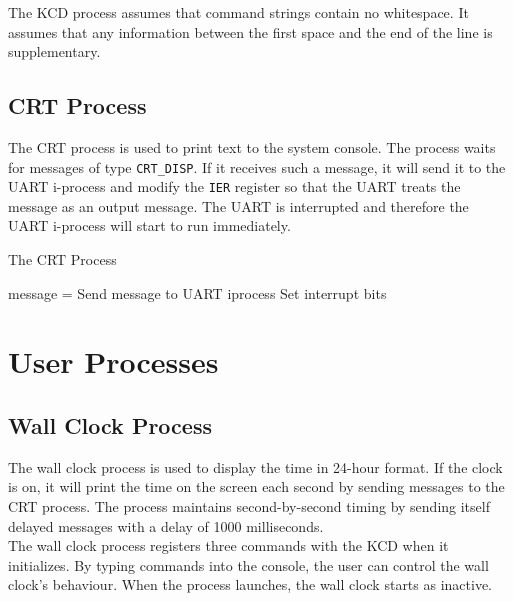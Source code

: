 \documentclass[12pt]{report}
\begin{document}
The KCD process assumes that command strings contain no whitespace. It assumes that any information between the first space and the end of the line is supplementary.\\

\subsection{CRT Process}

The CRT process is used to print text to the system console. The process waits for messages of type {\tt CRT\_DISP}. If it receives such a message, it will send it to the UART i-process and modify the {\tt IER} register so that the UART treats the message as an output message. The UART is interrupted and therefore the UART i-process will start to run immediately.\\

\begin{algorithm}
  \caption{The CRT Process}
  \begin{algorithmic}[1]
			\State message = 
				\State Send message to UART iprocess
				\State Set interrupt bits
			\Else
				\State {}
			\EndIf
		\EndWhile
    \EndProcedure
  \end{algorithmic}
\end{algorithm}


\section{User Processes}

\subsection{Wall Clock Process}

The wall clock process is used to display the time in 24-hour format. If the clock is on, it will print the time on the screen each second by sending messages to the CRT process. The process maintains second-by-second timing by sending itself delayed messages with a delay of 1000 milliseconds.\\

The wall clock process registers three commands with the KCD when it initializes. By typing commands into the console, the user can control the wall clock's behaviour. When the process launches, the wall clock starts as inactive.\\
\end{document}
